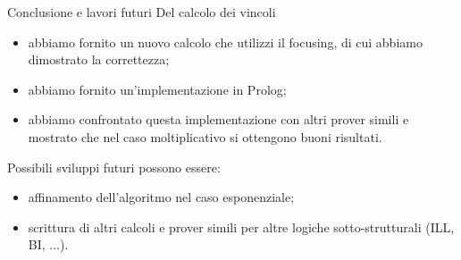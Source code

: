 \documentclass{beamer}
\begin{document}
\begin{frame}{Conclusione e lavori futuri}
	Del calcolo dei vincoli
	\begin{itemize}
		\item abbiamo fornito un nuovo calcolo che utilizzi il focusing, di cui abbiamo dimostrato la correttezza;
		\item abbiamo fornito un'implementazione in Prolog;
		\item abbiamo confrontato questa implementazione con altri prover simili e mostrato che nel caso moltiplicativo si ottengono buoni risultati.
	\end{itemize}
  	Possibili sviluppi futuri possono essere:
	\begin{itemize}
		\item affinamento dell'algoritmo nel caso esponenziale;
		\item scrittura di altri calcoli e prover simili per altre logiche sotto-strutturali (ILL, BI, ...).
	\end{itemize}
\end{frame}

\backmatter[notitle]
\end{document}
